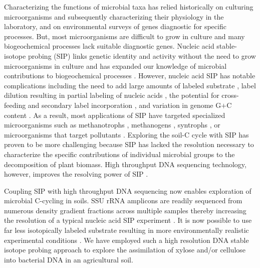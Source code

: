 Characterizing the functions of microbial taxa has relied historically on
culturing microorganisms and subsequently characterizing their physiology in
the laboratory, and on environmental surveys of genes diagnostic for specific
processes. But, most microorganisms are difficult to grow in culture
\citep{Janssen2006} and many biogeochemical processes lack suitable diagnostic
genes. Nucleic acid stable-isotope probing (SIP) links genetic identity and
activity without the need to grow microorganisms in culture and has expanded
our knowledge of microbial contributions to biogeochemical processes
\citep{Chen_Murrell_2010}. However, nucleic acid SIP has notable complications
including the need to add large amounts of labeled substrate
\citep{radajewski2000stable}, label dilution resulting in partial labeling of
nucleic acids \citep{radajewski2000stable,Manefield_2002,McDonald_2005}, the
potential for cross-feeding and secondary label incorporation
\citep{Morris_2002,Hutchens2004,14686943,DeRito2005,McDonald_2005,Ziegler_2005},
and variation in genome G$+$C content
\citep{Buckley_2007,9780408708036,Holben1995,Nusslein1999}. As a result, most
applications of SIP have targeted specialized microorganisms such as
methanotrophs \citep{radajewski2000stable}, methanogens \citep{lu2005},
syntrophs \citep{lueders2004}, or microorganisms that target pollutants
\citep{derito2005}. Exploring the soil-C cycle with SIP has proven to be more
challenging because SIP has lacked the resolution necessary to characterize the
specific contributions of individual microbial groups to the decomposition of
plant biomass. High throughput DNA sequencing technology, however, improves the
resolving power of SIP \citep{Aoyagi2015}. 

Coupling SIP with high throughput DNA sequencing now enables exploration of
microbial C-cycling in soils. SSU rRNA amplicons are readily sequenced from
numerous density gradient fractions across multiple samples thereby increasing
the resolution of a typical nucleic acid SIP experiment
\citep{Verastegui_2014}. It is now possible to use far less isotopically
labeled substrate resulting in more environmentally realistic experimental
conditions \citep{Aoyagi2015}. We have employed such a high resolution DNA
stable isotope probing approach to explore the assimilation of 
xylose and/or cellulose into bacterial DNA in an agricultural soil. 

